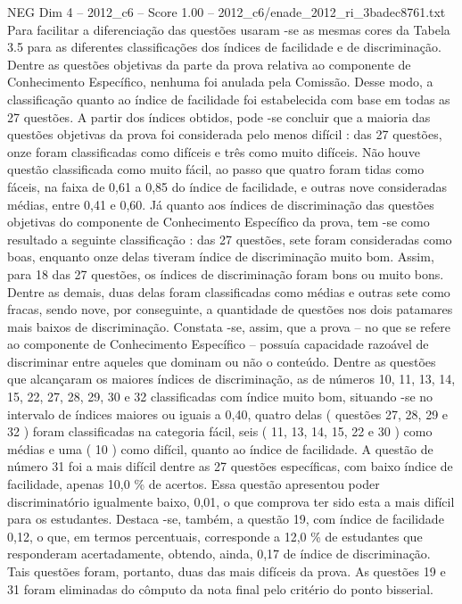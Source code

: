 \begin{textsample}{NEG Dim 4 – 2012\_c6 – Score 1.00 – 2012\_c6/enade\_2012\_ri\_3badec8761.txt}
Para facilitar a diferenciação das questões usaram -se as mesmas cores da Tabela 3.5 para as diferentes classificações dos índices de facilidade e de discriminação.
Dentre as questões objetivas da parte da prova relativa ao componente de Conhecimento Específico, nenhuma foi anulada pela Comissão.
Desse modo, a classificação quanto ao índice de facilidade foi estabelecida com base em todas as 27 questões.
A partir dos índices obtidos, pode -se concluir que a maioria das questões objetivas da prova foi considerada pelo menos difícil : das 27 questões, onze foram classificadas como difíceis e três como muito difíceis.
Não houve questão classificada como muito fácil, ao passo que quatro foram tidas como fáceis, na faixa de 0,61 a 0,85 do índice de facilidade, e outras nove consideradas médias, entre 0,41 e 0,60.
Já quanto aos índices de discriminação das questões objetivas do componente de Conhecimento Específico da prova, tem -se como resultado a seguinte classificação : das 27 questões, sete foram consideradas como boas, enquanto onze delas tiveram índice de discriminação muito bom.
Assim, para 18 das 27 questões, os índices de discriminação foram bons ou muito bons.
Dentre as demais, duas delas foram classificadas como médias e outras sete como fracas, sendo nove, por conseguinte, a quantidade de questões nos dois patamares mais baixos de discriminação.
Constata -se, assim, que a prova – no que se refere ao componente de Conhecimento Específico – possuía capacidade razoável de discriminar entre aqueles que dominam ou não o conteúdo.
Dentre as questões que alcançaram os maiores índices de discriminação, as de números 10, 11, 13, 14, 15, 22, 27, 28, 29, 30 e 32 classificadas com índice muito bom, situando -se no intervalo de índices maiores ou iguais a 0,40, quatro delas ( questões 27, 28, 29 e 32 ) foram classificadas na categoria fácil, seis ( 11, 13, 14, 15, 22 e 30 ) como médias e uma ( 10 ) como difícil, quanto ao índice de facilidade.
A questão de número 31 foi a mais difícil dentre as 27 questões específicas, com baixo índice de facilidade, apenas 10,0 \% de acertos.
Essa questão apresentou poder discriminatório igualmente baixo, 0,01, o que comprova ter sido esta a mais difícil para os estudantes.
Destaca -se, também, a questão 19, com índice de facilidade 0,12, o que, em termos percentuais, corresponde a 12,0 \% de estudantes que responderam acertadamente, obtendo, ainda, 0,17 de índice de discriminação.
Tais questões foram, portanto, duas das mais difíceis da prova.
As questões 19 e 31 foram eliminadas do cômputo da nota final pelo critério do ponto bisserial.

\end{textsample}
